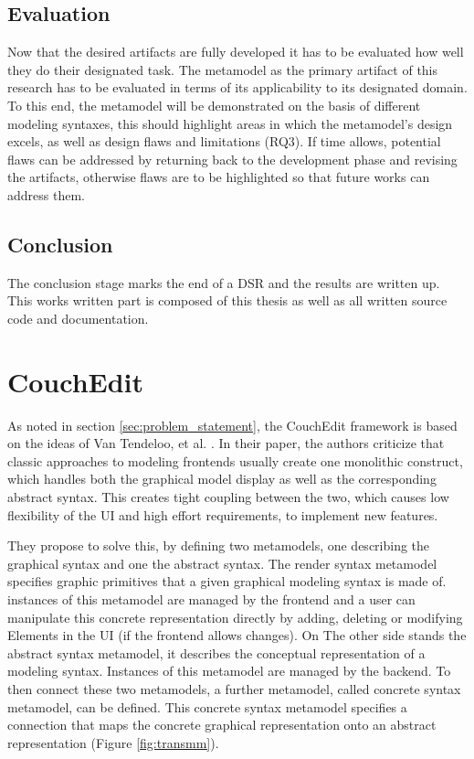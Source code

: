 \subsection{Evaluation}
Now that the desired artifacts are fully developed it has to be evaluated how well they do their designated task. The metamodel as the primary artifact of this research has to be evaluated in terms of its applicability to its designated domain. To this end, the metamodel will be demonstrated on the basis of different modeling syntaxes, this should highlight areas in which the metamodel's design excels, as well as design flaws and limitations (RQ3). If time allows, potential flaws can be addressed by returning back to the development phase and revising the artifacts, otherwise flaws are to be highlighted so that future works can address them.

\subsection{Conclusion}
The conclusion stage marks the end of a DSR and the results are written up. This works written part is composed of this thesis as well as all written source code and documentation.


\section{CouchEdit}
\label{sec:CouchEdit}
As noted in section \ref{sec:problem_statement}, the CouchEdit framework is based on the ideas of Van Tendeloo, et al. \cite{van_tendeloo_concrete_2017}. In their paper, the authors criticize that classic approaches to modeling frontends usually create one monolithic construct, which handles both the graphical model display as well as the corresponding abstract syntax. This creates tight coupling between the two, which causes low flexibility of the UI and high effort requirements, to implement new features. 

They propose to solve this, by defining two metamodels, one describing the graphical syntax and one the abstract syntax. The render syntax metamodel specifies graphic primitives that a given graphical modeling syntax is made of. instances of this metamodel are managed by the frontend and a user can manipulate this concrete representation directly by adding, deleting or modifying Elements in the UI (if the frontend allows changes). On The other side stands the abstract syntax metamodel, it describes the conceptual representation of a modeling syntax. Instances of this metamodel are managed by the backend. To then connect these two metamodels, a further metamodel, called concrete syntax metamodel, can be defined. This concrete syntax metamodel specifies a connection that maps the concrete graphical representation onto an abstract representation (Figure \ref{fig:transmm}). 


